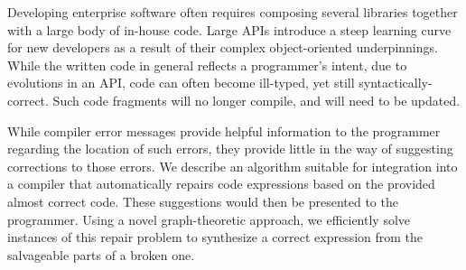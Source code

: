 Developing enterprise software often requires composing several
libraries together with a large body of in-house code. Large APIs
introduce a steep learning curve for new developers as a result of
their complex object-oriented underpinnings. While the written code in
general reflects a programmer's intent, due to evolutions in an API,
code can often become ill-typed, yet still syntactically-correct. Such
code fragments will no longer compile, and will need to be updated.

While compiler error messages provide helpful information to the
programmer regarding the location of such errors, they provide little
in the way of suggesting corrections to those errors. We describe an
algorithm suitable for integration into a compiler that automatically
repairs code expressions based on the provided almost correct
code. These suggestions would then be presented to the
programmer. Using a novel graph-theoretic approach, we efficiently
solve instances of this repair problem to synthesize a correct
expression from the salvageable parts of a broken one.
